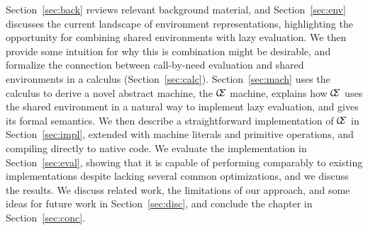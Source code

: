 Section~\ref{sec:back} reviews relevant background material, and
Section~\ref{sec:env} discusses the current landscape of environment
representations, highlighting the opportunity for combining shared environments
with lazy evaluation.  We then provide some intuition for why this is 
combination might be desirable, and formalize the connection between call-by-need
evaluation and shared environments in a calculus (Section~\ref{sec:calc}).
Section~\ref{sec:mach} uses the calculus to derive a novel abstract machine,
the $\mathcal{\mathcal{C} \mskip -4mu \mathcal{E}}$ machine, explains how
$\mathcal{\mathcal{C} \mskip -4mu \mathcal{E}}$ uses the shared environment in
a natural way to implement lazy evaluation, and gives its formal semantics.  We
then describe a straightforward implementation of $\mathcal{\mathcal{C} \mskip
-4mu \mathcal{E}}$ in Section~\ref{sec:impl}, extended with machine literals
and primitive operations, and compiling directly to native code. We evaluate the
implementation in Section~\ref{sec:eval}, showing that it is capable of
performing comparably to existing implementations despite lacking several
common optimizations, and we discuss the results. We discuss related work, the
limitations of our approach, and some ideas for future work in
Section~\ref{sec:disc}, and conclude the chapter in Section~\ref{sec:conc}.


